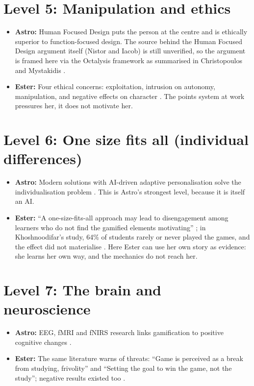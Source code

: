 \documentclass{article}
\begin{document}
\section{Level 5: Manipulation and ethics}
\begin{itemize}
  \item \textbf{Astro:} Human Focused Design puts the person at the centre and is ethically superior to function-focused design. The source behind the Human Focused Design argument itself (Nistor and Iacob) is still unverified, so the argument is framed here via the Octalysis framework as summarised in Christopoulos and Mystakidis \cite{christopoulos2023}.
  \item \textbf{Ester:} Four ethical concerns: exploitation, intrusion on autonomy, manipulation, and negative effects on character \cite{kim2016}. The points system at work pressures her, it does not motivate her.
\end{itemize}

\section{Level 6: One size fits all (individual differences)}
\begin{itemize}
  \item \textbf{Astro:} Modern solutions with AI-driven adaptive personalisation solve the individualisation problem \cite{christopoulos2023}. This is Astro's strongest level, because it is itself an AI.
  \item \textbf{Ester:} ``A one-size-fits-all approach may lead to disengagement among learners who do not find the gamified elements motivating'' \cite{christopoulos2023}; in Khoshnoodifar's study, 64\% of students rarely or never played the games, and the effect did not materialise \cite{khoshnoodifar2023}. Here Ester can use her own story as evidence: she learns her own way, and the mechanics do not reach her.
\end{itemize}

\section{Level 7: The brain and neuroscience}
\begin{itemize}
  \item \textbf{Astro:} EEG, fMRI and fNIRS research links gamification to positive cognitive changes \cite{biryukov2021}.
  \item \textbf{Ester:} The same literature warns of threats: ``Game is perceived as a break from studying, frivolity'' and ``Setting the goal to win the game, not the study''; negative results existed too \cite{biryukov2021}.
\end{itemize}
\end{document}
